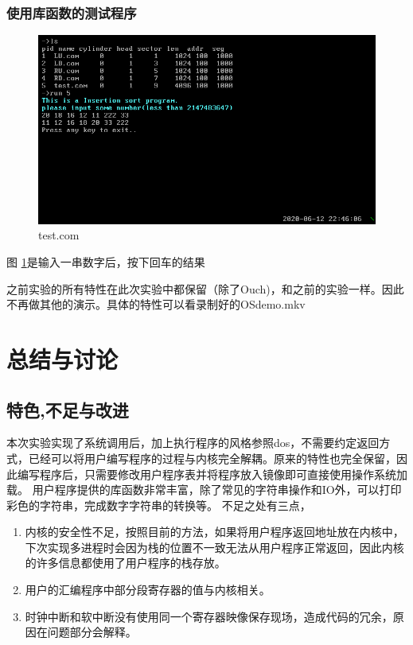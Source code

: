 \documentclass[a4paper, 11pt]{article} %
\begin{document}
\subsubsection{使用库函数的测试程序}
\begin{figure}[H]
  \centering
  \includegraphics[width=0.8\linewidth]{test.png}
  \caption{test.com}
  \label{fig:test.com}
\end{figure}
图 \ref{fig:test.com}是输入一串数字后，按下回车的结果

之前实验的所有特性在此次实验中都保留（除了Ouch)，和之前的实验一样。因此不再做其他的演示。具体的特性可以看录制好的OSdemo.mkv

\section{总结与讨论}



\subsection{特色,不足与改进}

本次实验实现了系统调用后，加上执行程序的风格参照dos，不需要约定返回方式，已经可以将用户编写程序的过程与内核完全解耦。原来的特性也完全保留，因此编写程序后，只需要修改用户程序表并将程序放入镜像即可直接使用操作系统加载。
用户程序提供的库函数非常丰富，除了常见的字符串操作和IO外，可以打印彩色的字符串，完成数字字符串的转换等。
不足之处有三点，
\begin{enumerate}
  \item 内核的安全性不足，按照目前的方法，如果将用户程序返回地址放在内核中，下次实现多进程时会因为栈的位置不一致无法从用户程序正常返回，因此内核的许多信息都使用了用户程序的栈存放。
  \item 用户的汇编程序中部分段寄存器的值与内核相关。
  \item 时钟中断和软中断没有使用同一个寄存器映像保存现场，造成代码的冗余，原因在问题部分会解释。
\end{enumerate}
\end{document}

